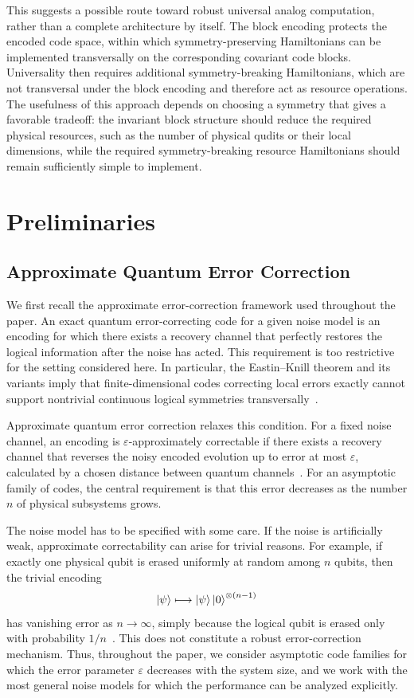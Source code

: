 \documentclass[10pt,twocolumn,superscriptaddress,aps,amsmath,amssymb,citeautoscript,floatfix,prx]{revtex4-2}
\theoremstyle{plain}
\theoremstyle{plain}
\theoremstyle{plain}
\theoremstyle{plain}
\theoremstyle{plain}
\theoremstyle{plain}
\theoremstyle{plain}
\theoremstyle{definition}
\theoremstyle{plain}
\begin{document}
This suggests a possible route toward robust universal analog computation, rather than a complete architecture by itself. 
The block encoding protects the encoded code space, within which symmetry-preserving Hamiltonians can be 
implemented transversally on the corresponding covariant code blocks. Universality then requires additional symmetry-breaking Hamiltonians, 
which are not transversal under the block encoding and therefore act as resource operations. 
The usefulness of this approach depends on choosing a symmetry that gives a favorable tradeoff: 
the invariant block structure should reduce the required physical resources, such as the number of physical qudits or their local dimensions, 
while the required symmetry-breaking resource Hamiltonians should remain sufficiently simple to implement.

\section{Preliminaries}\label{sec:main_prelim}

\subsection{Approximate Quantum Error Correction}\label{subsec:main_AQEC}

We first recall the approximate error-correction framework used throughout the paper. 
An exact quantum error-correcting code for a given noise model is an encoding for which there exists a recovery 
channel that perfectly restores the logical information after the noise has acted. This requirement is too restrictive 
for the setting considered here. In particular, the Eastin--Knill theorem and its variants imply that finite-dimensional codes 
correcting local errors exactly cannot support nontrivial continuous logical symmetries transversally~\cite{Eastin2009}.

Approximate quantum error correction relaxes this condition. For a fixed noise channel, 
an encoding is $\varepsilon$-approximately correctable if there exists a recovery channel that reverses the noisy encoded evolution 
up to error at most $\varepsilon$, calculated by a chosen distance between quantum channels~\cite{Beny2010}. 
For an asymptotic family of codes, the central requirement is that this error decreases as the number $n$ of physical subsystems grows.

The noise model has to be specified with some care. If the noise is artificially weak, approximate correctability can arise for trivial reasons.
 For example, if exactly one physical qubit is erased uniformly at random among $n$ qubits, then the trivial encoding
$$
\ket\psi
\longmapsto
\ket\psi\ket 0^{\otimes(n-1)}
$$
has vanishing error as $n\to\infty$, simply because the logical qubit is erased only with probability $1/n$~\cite{Yi2024}. 
This does not constitute a robust error-correction mechanism. Thus, throughout the paper, we consider asymptotic code families 
for which the error parameter $\varepsilon$ decreases with the system size, and we work with the most general noise models for which 
the performance can be analyzed explicitly.
\end{document}
